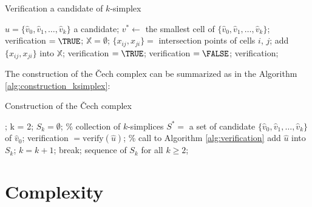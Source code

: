 \documentclass[conference]{IEEEtran}
\begin{document}
\begin{algorithm}[H]
\caption{Verification a candidate of $k$-simplex}
\label{alg:verification}
\begin{algorithmic}
\REQUIRE $\hat{u} = \{\hat{v}_0, \hat{v}_1, \ldots, \hat{v}_k\}$ a candidate;
	\STATE $v^{\ast} \gets$ the smallest cell of $\{\hat{v}_0, \hat{v}_1, \ldots, \hat{v}_k\}$;
		\STATE verification $= \TRUE$; 
	\ELSE
		\STATE $\mathbb{X} = \emptyset$;
				\STATE $\{x_{ij}, x_{ji}\} = $ intersection points of cells $i$, $j$;
				\STATE add $\{x_{ij}, x_{ji}\}$ into $\mathbb{X}$;
			\ENDFOR
		\ENDFOR
			\STATE verification $= \TRUE$;
		\ELSE
			\STATE verification $= \FALSE$;
		\ENDIF
	\ENDIF
	\RETURN verification;
\end{algorithmic}
\end{algorithm}
\vspace{-1mm}
The construction of the \v{C}ech complex can be summarized as in the Algorithm \ref{alg:construction_ksimplex}:
\vspace{-1mm}
\begin{algorithm}[H]
\caption{Construction of the \v{C}ech complex}
\label{alg:construction_ksimplex}
\begin{algorithmic}
;
\STATE k = 2;
	\STATE $S_k = \emptyset$; \% collection of $k$-simplices
		\STATE $S^{\ast} = $ a set of candidate $\{\hat{v}_0, \hat{v}_1, \ldots, \hat{v}_k\}$ of $\hat{v}_0$;
			\STATE verification $= \text{verify}(\hat{u})$; \% call to Algorithm \ref{alg:verification}
				\STATE add $\hat{u}$ into $S_k$;
			\ENDIF
		\ENDFOR
	\ENDFOR
		\STATE $k = k+1$;
	\ELSE
		\STATE break;
	\ENDIF
\ENDWHILE
\RETURN sequence of $S_k$ for all $k \geq 2$;
\end{algorithmic}
\end{algorithm}
















\section{Complexity}
\end{document}
